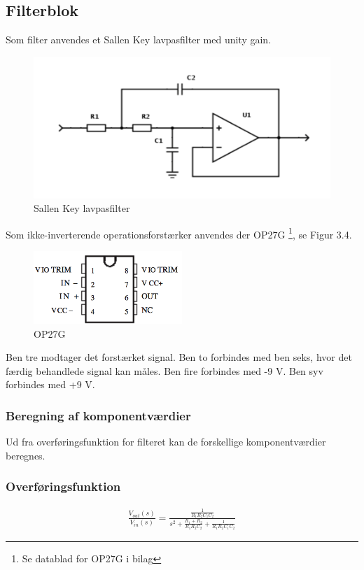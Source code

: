 \subsection{Filterblok}
Som filter anvendes et Sallen Key lavpasfilter med unity gain.

\begin{figure}[H]
	\centering
	\includegraphics[width=1\textwidth]{Figurer/Snip20151117_105}
	\caption{Sallen Key lavpasfilter}
\end{figure}

Som ikke-inverterende operationsforstærker anvendes der OP27G \footnote{Se datablad for OP27G i bilag}, se Figur 3.4. 

\begin{figure}[H]
	\centering
	\includegraphics[width=0.5\textwidth]{Figurer/Snip20151207_49}
	\caption{OP27G}
\end{figure}

Ben tre modtager det forstærket signal. Ben to forbindes med ben seks, hvor det færdig behandlede signal kan måles. Ben fire forbindes med -9 V. Ben syv forbindes med +9 V.  


\subsubsection{Beregning af komponentværdier}
Ud fra overføringsfunktion for filteret kan de forskellige komponentværdier beregnes. 

\subsubsection{Overføringsfunktion}
\begin{align}
	\frac{V_{out}(s)}{V_{in}(s)}=\frac{\frac{1}{R_1R_2C_1C_2}}{s^2+\frac{R_1+R_2}{R_1R_2C_2}+\frac{1}{R_1R_2C_1C_2}}
\end{align}

